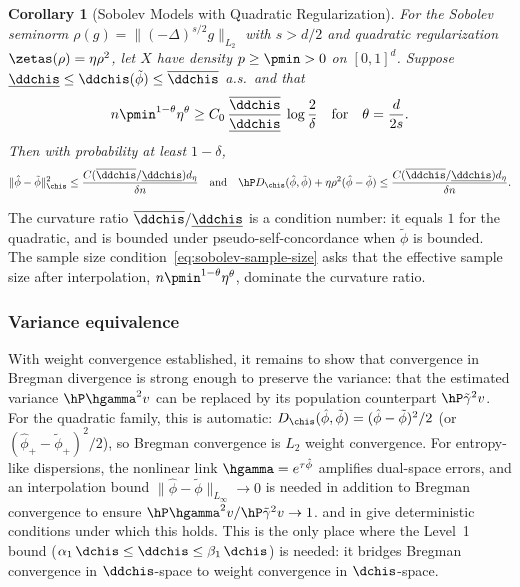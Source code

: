 \documentclass{article}
\newtheorem{corollary}[theorem]{Corollary}
\begin{document}
\begin{corollary}[Sobolev Models with Quadratic Regularization]
\label{cor:sobolev-main}
For the Sobolev seminorm $\rho(g) = \|(-\Delta)^{s/2} g\|_{L_2}$ with $s > d/2$ and quadratic regularization $\zetas(\rho) = \eta\rho^2$, let $X$ have density $p \ge \pmin > 0$ on $[0,1]^d$. Suppose $\underline{\ddchis} \le \ddchis(\tilde\phi) \le \overline{\ddchis}$ a.s.\ and that
\begin{equation}
\label{eq:sobolev-sample-size}
n\pmin^{1-\theta}\eta^\theta
  \ge C_0\, \frac{\overline{\ddchis}}{\underline{\ddchis}}\,
  \log\frac{2}{\delta}
\qqtext{for} \theta = \frac{d}{2s}.
\end{equation}
Then with probability at least $1 - \delta$,
\[
\|\hat\phi - \tilde\phi\|_{\chis}^2 \le \frac{C (\overline{\ddchis}/\underline{\ddchis}) d_\eta}{\delta n}
\qqtext{and}
\hP D_{\chis}(\hat\phi, \tilde\phi) + \eta\rho^2(\hat\phi - \tilde\phi) \le \frac{C (\overline{\ddchis}/\underline{\ddchis}) d_\eta}{\delta n}.
\]
\end{corollary}
The curvature ratio $\overline{\ddchis}/\underline{\ddchis}$ is a condition number: it equals $1$ for the quadratic, and is bounded under pseudo-self-concordance when $\tilde\phi$ is bounded. The sample size condition~\eqref{eq:sobolev-sample-size} asks that the effective sample size after interpolation, $n\pmin^{1-\theta}\eta^\theta$, dominate the curvature ratio.

\subsubsection{Variance equivalence}

With weight convergence established, it remains to show that convergence in Bregman divergence is strong enough to preserve the variance: that the estimated variance $\hP \hgamma^2 v$ can be replaced by its population counterpart $\hP \tilde\gamma^2 v$. For the quadratic family, this is automatic: $D_{\chis}(\hat\phi, \tilde\phi) = (\hat\phi - \tilde\phi)^2/2$ (or $(\hat\phi_+ - \tilde\phi_+)^2/2$), so Bregman convergence is $L_2$ weight convergence. For entropy-like dispersions, the nonlinear link $\hgamma = e^{\tau\hat\phi}$ amplifies dual-space errors, and an interpolation bound $\|\hat\phi - \tilde\phi\|_{L_\infty} \to 0$ is needed in addition to Bregman convergence to ensure $\hP \hgamma^2 v / \hP \tilde\gamma^2 v \to 1$.  and  in  give deterministic conditions under which this holds. This is the only place where the Level~1 bound ($\alpha_1\, \dchis \le \ddchis \le \beta_1\, \dchis$) is needed: it bridges Bregman convergence in $\ddchis$-space to weight convergence in $\dchis$-space.
\end{document}
